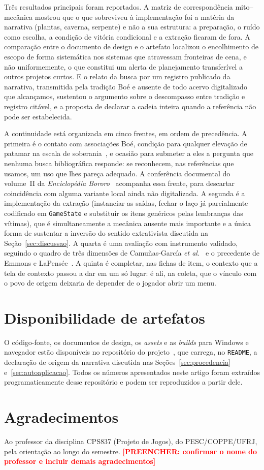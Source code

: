 \documentclass[conference]{IEEEtran}
\newcommand{\preencher}[1]{\textcolor{red}{\textbf{[PREENCHER: #1]}}}
\begin{document}
Três resultados principais foram reportados. A matriz de correspondência mito--mecânica
mostrou que o que sobreviveu à implementação foi a matéria da narrativa (plantas,
caverna, serpente) e não a sua estrutura: a preparação, o ruído como escolha, a condição
de vitória condicional e a extração ficaram de fora. A comparação entre o documento de
design e o artefato localizou o encolhimento de escopo de forma sistemática nos sistemas
que atravessam fronteiras de cena, e não uniformemente, o que constitui um alerta de
planejamento transferível a outros projetos curtos. E o relato da busca por um registro
publicado da narrativa, transmitida pela tradição Boé e ausente de todo acervo
digitalizado que alcançamos, sustentou o argumento sobre o descompasso entre tradição e
registro citável, e a proposta de declarar a cadeia inteira quando a referência não pode
ser estabelecida.

A continuidade está organizada em cinco frentes, em ordem de precedência. A primeira é o
contato com associações Boé, condição para qualquer elevação de patamar na escala de
soberania~\cite{lapensee2022}, e ocasião para submeter a eles a pergunta que nenhuma busca
bibliográfica responde: se reconhecem, nas referências que usamos, um uso que lhes pareça
adequado. A conferência documental do volume~II da \textit{Enciclopédia
Bororo}~\cite{albisetti1969} acompanha essa frente, para descartar coincidência com alguma
variante local ainda não digitalizada. A segunda é a implementação da extração
(instanciar as saídas, fechar o laço já parcialmente codificado em \texttt{GameState} e
substituir os itens genéricos pelas lembranças das vítimas), que é simultaneamente a
mecânica ausente mais importante e a única forma de sustentar a inversão do sentido
extrativista discutida na Seção~\ref{sec:discussao}. A quarta é uma avaliação com
instrumento validado, seguindo o quadro de três dimensões de Camuñas-García
\textit{et al.}~\cite{camunas2023} e o precedente de Emmons e
LaPensée~\cite{emmons2021}. A quinta é completar, nas fichas de item, o
contexto que a tela de contexto passou a dar em um só lugar: é ali, na coleta, que o
vínculo com o povo de origem deixaria de depender de o jogador abrir um menu.

\section*{Disponibilidade de artefatos}

O código-fonte, os documentos de design, os \textit{assets} e as \textit{builds} para
Windows e navegador estão disponíveis no repositório do projeto~\cite{repo2026}, que
carrega, no \texttt{README}, a declaração de origem da narrativa discutida nas
Seções~\ref{sec:procedencia} e~\ref{sec:autoaplicacao}. Todos os números apresentados neste artigo
foram extraídos programaticamente desse repositório e podem ser reproduzidos a partir
dele.

\section*{Agradecimentos}

Ao professor da disciplina CPS837 (Projeto de Jogos), do PESC/COPPE/UFRJ, pela
orientação ao longo do semestre. \preencher{confirmar o nome do professor e incluir
demais agradecimentos}



\end{document}
